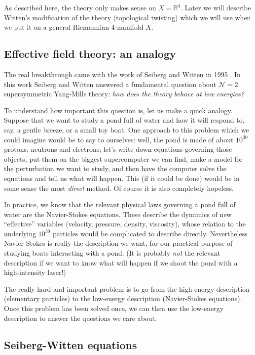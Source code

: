 \documentclass[12pt,letterpaper,reqno]{article}
\numberwithin{equation}{section}
\newcommand{\cN}{\ensuremath{\mathcal N}}
\newcommand{\R}{\ensuremath{\mathbb R}}
\newcommand{\ti}[1]{\textit{#1}}
\begin{document}
As described here, the theory only makes sense on $X = \R^4$.
Later we will describe Witten's modification of the
theory (topological twisting)
which we will use when we put it on a general Riemannian $4$-manifold $X$.

\subsection{Effective field theory: an analogy}

The real breakthrough came with the work of Seiberg and Witten
in 1995 \cite{Seiberg:1994rs}.
In this work Seiberg and Witten answered a fundamental
question about $\cN=2$ supersymmetric Yang-Mills theory:
\ti{how does the theory behave at low energies?}

To understand how important this question is, let us make a quick
analogy. Suppose that we want to study a pond full of water and how
it will respond to, say, a gentle breeze, or a small toy boat.
One approach to this problem which we could imagine would be to say
to ourselves: well, the pond is made of about $10^{30}$ protons,
neutrons and electrons; let's write down equations governing those objects,
put them on the biggest supercomputer we can find, make a model for the
perturbation we want to study, and then have the computer solve the
equations and tell us what will happen. This (if it could be done)
would be in some sense the most \ti{direct} method.
Of course it is also completely hopeless.

In practice, we know that the relevant physical laws
governing a pond full of water are the Navier-Stokes equations. These
describe the dynamics of new ``effective''
variables (velocity, pressure, density, viscosity), whose relation
to the underlying $10^{30}$ particles would be complicated
to describe directly. Nevertheless Navier-Stokes is really the
description we want, for our practical purpose of studying boats
interacting with a pond. (It is probably \ti{not} the
relevant description if we want to know what will happen if we shoot the
pond with a high-intensity laser!)

The really hard and important problem is to go from the high-energy
description (elementary particles) to the low-energy description
(Navier-Stokes equations). Once this problem has been solved once,
we can then use the low-energy description to answer the questions
we care about.


\subsection{Seiberg-Witten equations}
\end{document}
